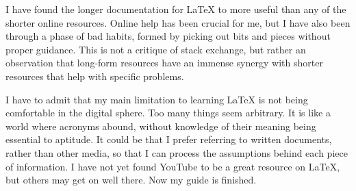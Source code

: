 \documentclass[11pt, oneside]{memoir}
\begin{document}
I have found the longer documentation for LaTeX to more useful than any of the shorter online resources. Online help has been crucial for me, but I have also been through a phase of bad habits, formed by picking out bits and pieces without proper guidance. This is not a critique of stack exchange, but rather an observation that long-form resources have an immense synergy with shorter resources that help with specific problems.

I have to admit that my main limitation to learning LaTeX is not being comfortable in the digital sphere. Too many things seem arbitrary. It is like a world where acronyms abound, without knowledge of their meaning being essential to aptitude. It could be that I prefer referring to written documents, rather than other media, so that I can process the assumptions behind each piece of information. I have not yet found YouTube to be a great resource on LaTeX, but others may get on well there.
\newpage
\thispagestyle{empty}
Now my guide is finished.
\end{document}
